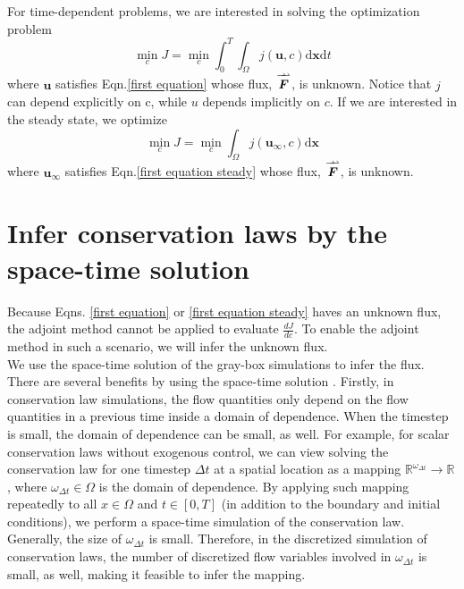 \documentclass{paper1}
\newcommand{\doublerightharpoonup}{%
  \rightharpoonup\mkern-10mu\rightharpoonup%
}
\begin{document}
For time-dependent problems, we are interested in solving the optimization problem
\begin{equation}
    \min_{c}J = \min_{c}\int_0^T \int_\Omega j(\boldsymbol{u},c) \textrm{d}\mathbf{x}\textrm{d}t
    \label{obj prototype}
\end{equation}
where $\boldsymbol{u}$ satisfies Eqn.\eqref{first equation}
whose flux, $\overset{\doublerightharpoonup}{\boldsymbol{F}}$, is unknown.
Notice that $j$ can depend explicitly on c, while $u$ depends implicitly on $c$.
If we are interested in the steady state, we optimize
\begin{equation}
    \min_{c}J =\min_{c} \int_\Omega j(\boldsymbol{u}_{\infty},c) \textrm{d}\mathbf{x}
\end{equation}
where $\boldsymbol{u}_{\infty}$ satisfies Eqn.\eqref{first equation steady}
whose flux, $\overset{\doublerightharpoonup}{\boldsymbol{F}}$, is unknown.

\section{Infer conservation laws by the space-time solution}
\label{infer}
Because Eqns. \eqref{first equation} or \eqref{first equation steady}
haves an unknown flux, the adjoint method cannot be applied to evaluate 
$\frac{dJ}{dc}$. To enable the adjoint method in such a scenario, we will infer
the unknown flux.\\

We use the space-time solution of the gray-box simulations 
to infer the flux.
There are several benefits by using the space-time solution \cite{hanmaster, ecmor}.
Firstly, in conservation law simulations, the flow quantities only depend on the flow
quantities in a previous time inside a domain of dependence.
When the timestep is small,
the domain of dependence can be small, as well. For example, for scalar conservation laws 
without exogenous control,
we can view solving the conservation law for one timestep $\Delta t$ at a spatial location
as a mapping 
$\mathbb{R}^{\omega_{\Delta t}} \rightarrow \mathbb{R}$, where $\omega_{\Delta t}\in \Omega$ 
is the domain of dependence. 
By applying such mapping repeatedly to all $x\in \Omega$ and $t\in[0,T]$
(in addition to the boundary and initial conditions), we perform 
a space-time simulation of the conservation law. 
Generally, the size of $\omega_{\Delta t}$ is small.
Therefore, in the discretized simulation of conservation laws,
the number of discretized flow variables involved in $\omega_{\Delta t}$ is small, as well,
making it feasible to infer the mapping.
\\
\end{document}
